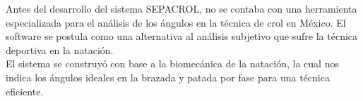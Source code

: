 Antes del desarrollo del sistema SEPACROL, no se contaba con una herramienta 
especializada para el análisis de los ángulos en la técnica de crol en México. El 
software se postula como una alternativa al análisis subjetivo que sufre la técnica 
deportiva en la natación.\\
El sistema se construyó con base a la biomecánica de la natación, la cual nos indica 
los ángulos ideales en la brazada y patada por fase para una técnica eficiente.